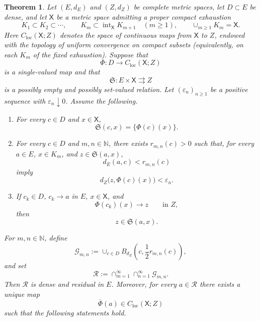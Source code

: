 \documentclass[12pt,oneside, reqno]{amsart}
\newtheorem{theorem}{Theorem}[section]
\numberwithin{equation}{section}
\begin{document}
	\begin{theorem}
		\label{thm:abstract-generic-canonical-extension}
		Let $(E,d_E)$ and $(Z,d_Z)$ be complete metric spaces, let
		$D\subset E$ be dense, and let $\mathsf X$ be a metric space admitting
		a proper compact exhaustion
		\[
		K_1\subset K_2\subset\cdots,
		\qquad
		K_m\subset\operatorname{int}_{\mathsf X}K_{m+1}
		\quad(m\geq1),
		\qquad
		\cup_{m\geq1}K_m=\mathsf X.
		\]
		Here $C_{\mathrm{loc}}(\mathsf X;Z)$ denotes the space of continuous
		maps from $\mathsf X$ to $Z$, endowed with the topology of uniform
		convergence on compact subsets (equivalently, on each $K_m$ of the
		fixed exhaustion). Suppose that
		\[
		\Phi:D\longrightarrow C_{\mathrm{loc}}(\mathsf X;Z)
		\]
		is a single-valued map and that
		\[
		\mathfrak S:E\times\mathsf X\rightrightarrows Z
		\]
		is a possibly empty and possibly set-valued relation. Let
		$(\varepsilon_n)_{n\geq1}$ be a positive sequence with
		$\varepsilon_n\downarrow0$. Assume the following.
		
		\begin{enumerate}
			\item[\textnormal{(G1)}]
			For every $c\in D$ and $x\in\mathsf X$,
			\[
			\mathfrak S(c,x)=\big\{\Phi(c)(x)\big\}.
			\]
			
			\item[\textnormal{(G2)}]
			For every $c\in D$ and $m,n\in\mathbb N$, there exists
			$r_{m,n}(c)>0$ such that, for every $a\in E$, $x\in K_m$, and
			$z\in\mathfrak S(a,x)$,
			\[
			d_E(a,c)<r_{m,n}(c)
			\]
			imply
			\[
			d_Z\bigl(z,\Phi(c)(x)\bigr)<\varepsilon_n.
			\]
			
			\item[\textnormal{(G3)}]
			If $c_k\in D$, $c_k\to a$ in $E$, $x\in\mathsf X$, and
			\[
			\Phi(c_k)(x)\longrightarrow z
			\qquad\text{in }Z,
			\]
			then
			\[
			z\in\mathfrak S(a,x).
			\]
		\end{enumerate}
		
		For $m,n\in\mathbb N$, define
		\begin{equation}
			\label{eq:abstract-generic-open-dense-set}
			\mathcal G_{m,n}
			:=
			\cup_{c\in D}
			B_{d_E}\left(c,\frac12r_{m,n}(c)\right),
		\end{equation}
		and set
		\begin{equation}
			\label{eq:abstract-generic-residual-set}
			\mathcal R
			:=
			\cap_{m=1}^{\infty}
			\cap_{n=1}^{\infty}
			\mathcal G_{m,n}.
		\end{equation}
		Then $\mathcal R$ is dense and residual in $E$. Moreover, for every
		$a\in\mathcal R$ there exists a unique map
		\[
		\overline\Phi(a)
		\in
		C_{\mathrm{loc}}(\mathsf X;Z)
		\]
		such that the following statements hold.
		

\end{theorem}
\end{document}
